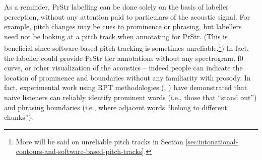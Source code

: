 \documentclass[11pt, twoside]{memoir}
\begin{document}
As a reminder, PrStr labelling can be done solely on the basis of labeller perception, without any attention paid to particulars of the acoustic signal. For example, pitch changes may be cues to prominence or phrasing, but labellers need not be looking at a pitch track when annotating for PrStr. (This is beneficial since software-based pitch tracking is sometimes unreliable.\footnote{More will be said on unreliable pitch tracks in Section \ref{sec:intonational-contours-and-software-based-pitch-tracks}.}) In fact, the labeller could provide PrStr tier annotations without any spectrogram, f0 curve, or other visualization of the acoustics – indeed people can indicate the location of prominence and boundaries without any familiarity with prosody. In fact, experimental work using RPT methodologies (\citealt{cole-14, cole-17}, \citealt{cole-16}) have demonstrated that naive listeners can reliably identify prominent words (i.e., those that “stand out”) and phrasing boundaries (i.e., where adjacent words “belong to different chunks”).
\end{document}
